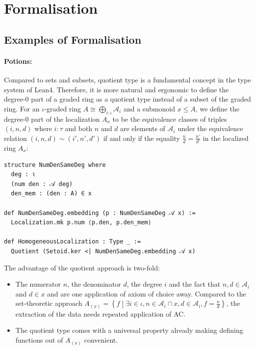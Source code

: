 \documentclass[graybox]{svmult}
\begin{document}
\section{Formalisation}

\subsection*{Examples of Formalisation} 

\paragraph{Potions:}%
Compared to sets and subsets, quotient type is a fundamental concept in the type system of Lean4. 
Therefore, it is more natural and ergonomic to define the degree-$0$ part of a graded ring as a quotient type 
instead of a subset of the graded ring. For an $\iota$-graded ring $A \cong \bigoplus_{i : \iota} \mathcal{A}_i$ and a submonoid $x \le A$, 
we define the degree-$0$ part of the localization $A_x$ to be the equivalence classes of triples $(i, n, d)$ where 
$i : \tau$ and both $n$ and $d$ are elements of $\mathcal{A}_i$ under the equivalence relation 
$(i, n, d) \sim (i', n', d')$ if and only if the equality $\frac{n}{d} = \frac{n'}{d'}$ in the localized ring $A_x$:
\begin{lstlisting}
structure NumDenSameDeg where
  deg : ι
  (num den : 𝒜 deg)
  den_mem : (den : A) ∈ x

def NumDenSameDeg.embedding (p : NumDenSameDeg 𝒜 x) :=
  Localization.mk p.num ⟨p.den, p.den_mem⟩

def HomogeneousLocalization : Type _ :=
  Quotient (Setoid.ker <| NumDenSameDeg.embedding 𝒜 x)
\end{lstlisting}
The advantage of the quotient approach is two-fold:
\begin{itemize}
  \item The numerator $n$, the denominator $d$, the degree $i$ and the fact that $n, d \in \mathcal{A}_i$ and $d \in x$ and  are one application of axiom of choice away.
  Compared to the set-theoretic approach $A_{(x)} = \left\{f\middle|\exists i \in \iota, n \in \mathcal{A}_i \cap x, d \in \mathcal{A}_i, f = \frac{n}{d}\right\}$, the extraction of the data needs repeated application of AC.
  \item The quotient type comes with a universal property already making defining functions out of $A_{(x)}$ convenient.
\end{itemize}
\end{document}
